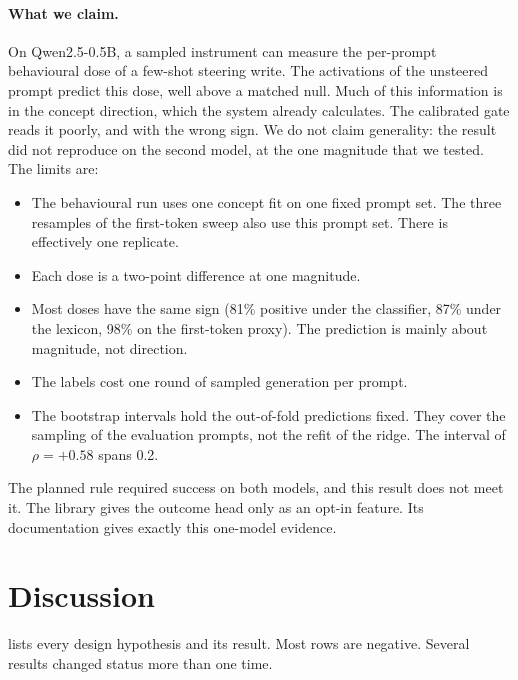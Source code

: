 \documentclass[11pt]{article}
\begin{document}
\paragraph{What we claim.} On Qwen2.5-0.5B, a sampled instrument can measure the per-prompt behavioural
dose of a few-shot steering write. The activations of the unsteered prompt predict this dose, well above a
matched null. Much of this information is in the concept direction, which the system already calculates.
The calibrated gate reads it poorly, and with the wrong sign. We do not claim generality: the result did
not reproduce on the second model, at the one magnitude that we tested. The limits are:
\begin{itemize}[leftmargin=*]
  \item The behavioural run uses one concept fit on one fixed prompt set. The three resamples of the
    first-token sweep also use this prompt set. There is effectively one replicate.
  \item Each dose is a two-point difference at one magnitude.
  \item Most doses have the same sign (81\% positive under the classifier, 87\% under the lexicon, 98\% on
    the first-token proxy). The prediction is mainly about magnitude, not direction.
  \item The labels cost one round of sampled generation per prompt.
  \item The bootstrap intervals hold the out-of-fold predictions fixed. They cover the sampling of the evaluation prompts, not the refit of the ridge. The interval of $\rho=+0.58$ spans 0.2.
\end{itemize}
The planned rule required success on both models, and this result does not meet it. The library gives the outcome head only as an opt-in feature. Its documentation gives exactly this one-model evidence.

\section{Discussion}
\label{sec:discussion}

 lists every design hypothesis and its result. Most rows are negative. Several results
changed status more than one time.
\end{document}
